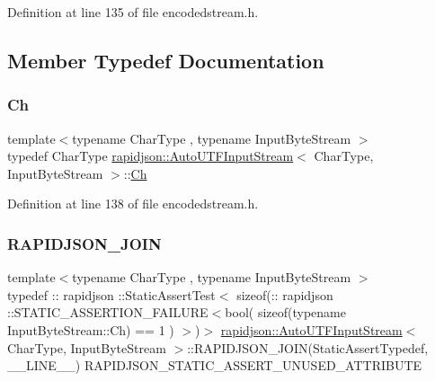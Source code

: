 Definition at line 135 of file encodedstream.\+h.



\subsection{Member Typedef Documentation}
\mbox{\label{classrapidjson_1_1_auto_u_t_f_input_stream_a6d9eca095f7ef8c249ebe43568d66d0e}} 
\subsubsection{\texorpdfstring{Ch}{Ch}}
{\footnotesize\ttfamily template$<$typename Char\+Type , typename Input\+Byte\+Stream $>$ \\
typedef Char\+Type \mbox{\hyperlink{classrapidjson_1_1_auto_u_t_f_input_stream}{rapidjson\+::\+Auto\+U\+T\+F\+Input\+Stream}}$<$ Char\+Type, Input\+Byte\+Stream $>$\+::\mbox{\hyperlink{classrapidjson_1_1_auto_u_t_f_input_stream_a6d9eca095f7ef8c249ebe43568d66d0e}{Ch}}}



Definition at line 138 of file encodedstream.\+h.

\mbox{\label{classrapidjson_1_1_auto_u_t_f_input_stream_ae19959155f693249ce5df05f6eb619a9}} 
\subsubsection{\texorpdfstring{RAPIDJSON\_JOIN}{RAPIDJSON\_JOIN}}
{\footnotesize\ttfamily template$<$typename Char\+Type , typename Input\+Byte\+Stream $>$ \\
typedef \+:: rapidjson \+::Static\+Assert\+Test$<$ sizeof(\+:: rapidjson \+::S\+T\+A\+T\+I\+C\+\_\+\+A\+S\+S\+E\+R\+T\+I\+O\+N\+\_\+\+F\+A\+I\+L\+U\+RE$<$bool( sizeof(typename Input\+Byte\+Stream\+::\+Ch) == 1 ) $>$)$>$ \mbox{\hyperlink{classrapidjson_1_1_auto_u_t_f_input_stream}{rapidjson\+::\+Auto\+U\+T\+F\+Input\+Stream}}$<$ Char\+Type, Input\+Byte\+Stream $>$\+::R\+A\+P\+I\+D\+J\+S\+O\+N\+\_\+\+J\+O\+IN(Static\+Assert\+Typedef, \+\_\+\+\_\+\+L\+I\+N\+E\+\_\+\+\_\+) R\+A\+P\+I\+D\+J\+S\+O\+N\+\_\+\+S\+T\+A\+T\+I\+C\+\_\+\+A\+S\+S\+E\+R\+T\+\_\+\+U\+N\+U\+S\+E\+D\+\_\+\+A\+T\+T\+R\+I\+B\+U\+TE\hspace{0.3cm}{\ttfamily [private]}}




